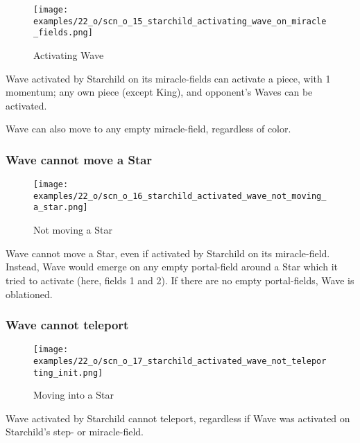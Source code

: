 \noindent
\begin{wrapfigure}[8]{l}{0.4\textwidth}
\centering
\texttt{[image: examples/22\_o/scn\_o\_15\_starchild\_activating\_wave\_on\_miracle\_fields.png]}
\caption{Activating Wave}
\label{fig:scn_o_15_starchild_activating_wave_on_miracle_fields}
\end{wrapfigure}
Wave activated by Starchild on its miracle-fields can activate a piece, with
1 momentum; any own piece (except King), and opponent's Waves can be activated.

Wave can also move to any empty miracle-field, regardless of color.

\subsubsection*{Wave cannot move a Star}
\label{sec:One/Starchild/Activating Wave/Wave cannot move a Star}

\noindent
\begin{wrapfigure}[9]{l}{0.4\textwidth}
\centering
\texttt{[image: examples/22\_o/scn\_o\_16\_starchild\_activated\_wave\_not\_moving\_a\_star.png]}
\caption{Not moving a Star}
\label{fig:scn_o_16_starchild_activated_wave_not_moving_a_star}
\end{wrapfigure}
Wave cannot move a Star, even if activated by Starchild on its miracle-field.
Instead, Wave would emerge on any empty portal-field around a Star which it tried
to activate (here, fields 1 and 2). If there are no empty portal-fields, Wave is
oblationed.

\clearpage %

\subsubsection*{Wave cannot teleport}
\label{sec:One/Starchild/Activating Wave/Wave cannot teleport}

\vspace*{-0.1\baselineskip}
\noindent
\begin{wrapfigure}[4]{l}{0.4\textwidth}
\centering
\texttt{[image: examples/22\_o/scn\_o\_17\_starchild\_activated\_wave\_not\_teleporting\_init.png]}
\vspace*{-0.4\baselineskip}
\caption{Moving into a Star}
\label{fig:scn_o_17_starchild_activated_wave_not_teleporting_init}
\end{wrapfigure}
Wave activated by Starchild cannot teleport, regardless if Wave was activated on
Starchild's step- or miracle-field.

